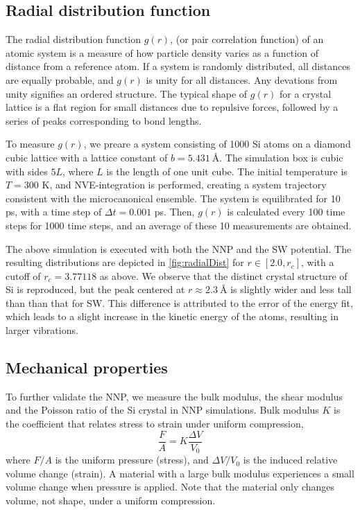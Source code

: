 \documentclass[twoside,english]{uiofysmaster}
\begin{document}
\subsection{Radial distribution function}
The radial distribution function $g(r)$, (or pair correlation function) of an atomic system is a measure of how 
particle density varies as a function of distance from a reference atom. If a system is randomly distributed, all distances
are equally probable, and $g(r)$ is unity for all distances. Any devations from unity signifies an ordered structure.
The typical shape of $g(r)$ for a crystal lattice is a flat region for small distances due to repulsive forces, 
followed by a series of peaks corresponding to bond lengths. 

To measure $g(r)$, we preare a system consisting of 1000 Si atoms on a diamond cubic lattice with a lattice constant 
of $b = \SI{5.431}{\angstrom}$. The simulation box is cubic with sides $5L$, where $L$ is the length of one unit cube.
The initial temperature is $T = 300$ K, and NVE-integration is performed, creating a system trajectory consistent with 
the microcanonical ensemble. The system is equilibrated for 10 ps, with a time step of $\Delta t = 0.001$ ps. Then, 
$g(r)$ is calculated every 100 time steps for 1000 time steps, and an average of these 10 measurements are obtained. 

The above simulation is executed with both the NNP and the SW potential. The resulting distributions are 
depicted in \autoref{fig:radialDist} for $r \in [2.0, r_c]$, with a cutoff of $r_c = 3.77118$ as above. 
We observe that the distinct crystal structure of Si is reproduced, but the peak centered at $r \approx \SI{2.3}{\angstrom}$
is slightly wider and less tall than than that for SW. This difference is attributed to the error of the energy fit, 
which leads to a slight increase in the kinetic energy of the atoms, resulting in larger vibrations. 

\subsection{Mechanical properties}
To further validate the NNP, we measure the bulk modulus, the shear modulus and the Poisson ratio of the Si crystal in 
NNP simulations. Bulk modulus $K$ is the coefficient that relates stress to strain under uniform compression,
\begin{equation}
 \frac{F}{A} = K\frac{\Delta V}{V_0}
\end{equation}
where $F/A$ is the uniform pressure (stress), and $\Delta V/V_0$ is the induced relative volume change (strain). 
A material with a large bulk modulus experiences a small volume change when pressure is applied. Note that the material 
only changes volume, not shape, under a uniform compression.
\end{document}
